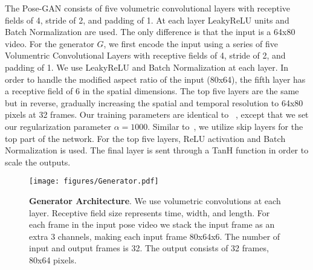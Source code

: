  The Pose-GAN consists of five volumetric convolutional layers with receptive fields of 4, stride of 2, and padding of 1. At each layer LeakyReLU units and Batch Normalization are used. The only difference is that the input is a 64x80 video. For the generator $G$, we first encode the input using a series of five Volumentric Convolutional Layers with receptive fields of 4, stride of 2, and padding of 1. We use LeakyReLU and Batch Normalization at each layer. In order to handle the modified aspect ratio of the input (80x64), the fifth layer has a receptive field of 6 in the spatial dimensions. The top five layers are the same but in reverse, gradually increasing the spatial and temporal resolution to 64x80 pixels at 32 frames. Our training parameters are identical to ~\cite{Vondrick16}, except that we set our regularization parameter $\alpha=1000$. Similar to~\cite{Isola16}, we utilize skip layers for the top part of the network. For the top five layers, ReLU activation and Batch Normalization is used. The final layer is sent through a TanH function in order to scale the outputs. 

\begin{figure}
\centering
\texttt{[image: figures/Generator.pdf]} 
\vspace{-0.2in}
\caption{{\bf Generator Architecture}. We use volumetric convolutions at each layer. Receptive field size represents time, width, and length. For each frame in the input pose video we stack the input frame as an extra 3 channels, making each input frame 80x64x6. The number of input and output frames is 32. The output consists of 32 frames, 80x64 pixels.}
\vspace{-0.2in}
\label{fig:GANArchitecture}
\end{figure}

